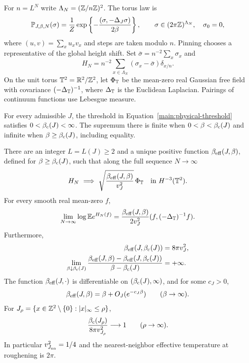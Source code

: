 For $n=L^N$ write $\Lambda_N=(\mathbb Z/n\mathbb Z)^2$.  The torus law is
\begin{equation}\label{main:torus-law}
 \mathbb P_{J,\beta,N}(\sigma)=\frac1Z
       \exp\left\{-\frac{(\sigma,-\Delta_J\sigma)}{2\beta}\right\},
 \qquad \sigma\in(2\pi\mathbb Z)^{\Lambda_N},\quad \sigma_0=0,
\end{equation}
where $(u,v)=\sum_xu_xv_x$ and steps are taken modulo $n$.
Pinning chooses a representative of the global height shift.
Set $\bar\sigma=n^{-2}\sum_x\sigma_x$ and
\begin{equation}\label{main:height-field}
 H_N=n^{-2}\sum_{x\in\Lambda_N}(\sigma_x-\bar\sigma)\delta_{x/n}.
\end{equation}
On the unit torus $\mathbb T^2=\mathbb R^2/\mathbb Z^2$, let $\Phi_{\mathbb T}$ be the mean-zero
real Gaussian free field with covariance $(-\Delta_{\mathbb T})^{-1}$,
where $\Delta_{\mathbb T}$ is the Euclidean Laplacian.  Pairings of continuum
functions use Lebesgue measure.

\begin{theorem}
\label{main:heights}
For every admissible $J$, the threshold in
Equation~\eqref{main:physical-threshold} satisfies $0<\beta_{\mathrm c}(J)<\infty$.
The supremum there is finite when $0<\beta<\beta_{\mathrm c}(J)$ and infinite when
$\beta\ge\beta_{\mathrm c}(J)$, including equality.

There are an integer $L=L(J)\ge2$ and a unique positive function
$\beta_{\mathrm{eff}}(J,\beta)$, defined for $\beta\ge\beta_{\mathrm c}(J)$, such that along the
full sequence $N\to\infty$
\begin{equation}\label{main:height-limit}
 H_N\ \Longrightarrow\
       \sqrt{\frac{\beta_{\mathrm{eff}}(J,\beta)}{v_J^2}}\,\Phi_{\mathbb T}
       \quad\hbox{in }H^{-3}(\mathbb T^2).
\end{equation}
For every smooth real mean-zero $f$,
\begin{equation}\label{main:height-laplace}
 \lim_{N\to\infty}\log\mathbb E e^{H_N(f)}
 =\frac{\beta_{\mathrm{eff}}(J,\beta)}{2v_J^2}
           (f,(-\Delta_{\mathbb T})^{-1}f).
\end{equation}
Furthermore,
\begin{align}
 \beta_{\mathrm{eff}}(J,\beta_{\mathrm c}(J))&=8\pi v_J^2,\label{main:height-endpoint}\\
 \lim_{\beta\downarrow\beta_{\mathrm c}(J)}
 \frac{\beta_{\mathrm{eff}}(J,\beta)-\beta_{\mathrm{eff}}(J,\beta_{\mathrm c}(J))}{\beta-\beta_{\mathrm c}(J)}
    &=+\infty.\label{main:height-slope}
\end{align}
The function $\beta_{\mathrm{eff}}(J,\cdot)$ is differentiable on $(\beta_{\mathrm c}(J),\infty)$,
and for some $c_J>0$,
\begin{equation}\label{main:height-high-temperature}
 \beta_{\mathrm{eff}}(J,\beta)=\beta+O_J(e^{-c_J\beta})\qquad(\beta\to\infty).
\end{equation}
For $J_\rho=\{x\in\mathbb Z^2\setminus\{0\}:|x|_\infty\le\rho\}$,
\begin{equation}\label{main:height-spread}
 \frac{\beta_{\mathrm c}(J_\rho)}{8\pi v_{J_\rho}^2}\longrightarrow1
      \qquad(\rho\to\infty).
\end{equation}
In particular $v_{J_{\mathrm{nn}}}^2=1/4$ and the nearest-neighbor effective
temperature at roughening is $2\pi$.
\end{theorem}

